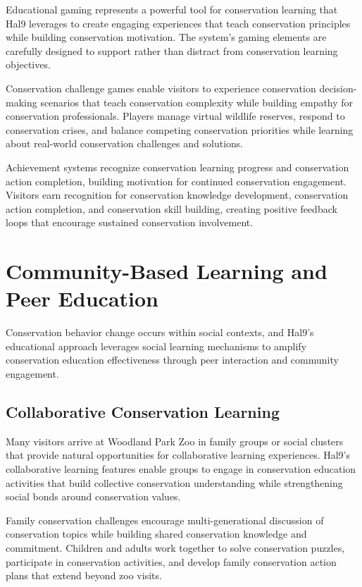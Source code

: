 \documentclass[
  Letterpaper,
]{scrbook}
\begin{document}
Educational gaming represents a powerful tool for conservation learning
that Hal9 leverages to create engaging experiences that teach
conservation principles while building conservation motivation. The
system's gaming elements are carefully designed to support rather than
distract from conservation learning objectives.

Conservation challenge games enable visitors to experience conservation
decision-making scenarios that teach conservation complexity while
building empathy for conservation professionals. Players manage virtual
wildlife reserves, respond to conservation crises, and balance competing
conservation priorities while learning about real-world conservation
challenges and solutions.

Achievement systems recognize conservation learning progress and
conservation action completion, building motivation for continued
conservation engagement. Visitors earn recognition for conservation
knowledge development, conservation action completion, and conservation
skill building, creating positive feedback loops that encourage
sustained conservation involvement.

\section{Community-Based Learning and Peer
Education}\label{community-based-learning-and-peer-education}

Conservation behavior change occurs within social contexts, and Hal9's
educational approach leverages social learning mechanisms to amplify
conservation education effectiveness through peer interaction and
community engagement.

\subsection{Collaborative Conservation
Learning}\label{collaborative-conservation-learning}

Many visitors arrive at Woodland Park Zoo in family groups or social
clusters that provide natural opportunities for collaborative learning
experiences. Hal9's collaborative learning features enable groups to
engage in conservation education activities that build collective
conservation understanding while strengthening social bonds around
conservation values.

Family conservation challenges encourage multi-generational discussion
of conservation topics while building shared conservation knowledge and
commitment. Children and adults work together to solve conservation
puzzles, participate in conservation activities, and develop family
conservation action plans that extend beyond zoo visits.
\end{document}
